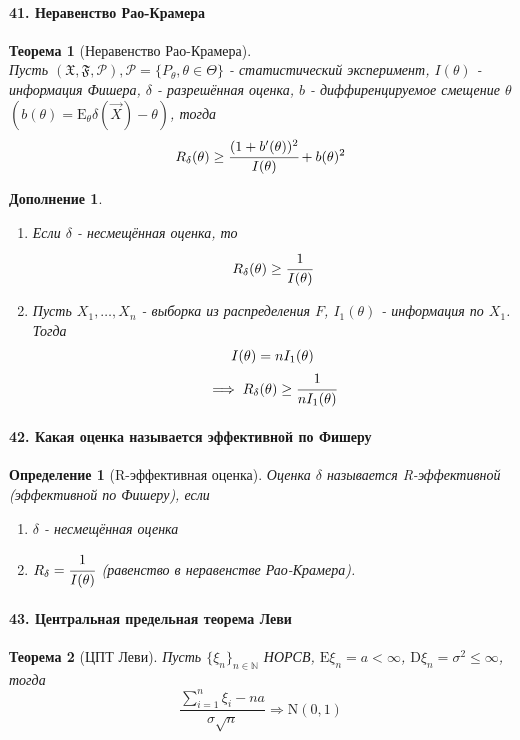 \documentclass[titlepage]{article}
\newcommand{\sP}{\mathcal{P}}
\newcommand{\sF}{\mathfrak{F}}
\newcommand{\sX}{\mathfrak{X}}
\newcommand{\sE}{\mathrm{E}}
\newcommand{\sD}{\mathrm{D}}
\newcommand{\sN}{\mathrm{N}} %
\newtheorem{theorem}{Теорема}
\newtheorem{definition}{Определение}
\newtheorem*{addition}{Дополнение}
\begin{document}
\paragraph{41. Неравенство Рао-Крамера}
\begin{theorem}[Неравенство Рао-Крамера] ~\\
	Пусть $(\sX,\sF,\sP), \sP = \{P_\theta, \theta \in \Theta\}$ - статистический эксперимент, $I(\theta)$ - информация Фишера, $\delta$ - разрешённая оценка, $b$ - диффиренцируемое смещение $\theta$	$(b(\theta) = \sE_\theta\delta(\vec X)-\theta)$, тогда
	\[R_\delta(\theta)\geq\cfrac{(1+b'(\theta))^2}{I(\theta)}+b(\theta)^2\]
\end{theorem}
\begin{addition} ~\\
	\begin{enumerate}
		\item Если $\delta$ - несмещённая оценка, то
		\[R_\delta(\theta)\geq\cfrac{1}{I(\theta)}\]
		\item Пусть $X_1,\dots,X_n$ - выборка из распределения $F$, $I_1(\theta)$ - информация по $X_1$. Тогда
		\begin{gather*}
			I(\theta) = nI_1(\theta)\\
			\implies R_\delta(\theta)\geq\cfrac{1}{nI_1(\theta)}
		\end{gather*}
	\end{enumerate}
\end{addition}

\paragraph{42. Какая оценка называется эффективной по Фишеру}
\begin{definition}[R-эффективная оценка]
	Оценка $\delta$ называется R-эффективной (эффективной по Фишеру), если
	\begin{enumerate}
		\item $\delta$ - несмещённая оценка
		\item $R_\delta = \cfrac{1}{I(\theta)}$ (равенство в неравенстве Рао-Крамера).
	\end{enumerate}
\end{definition}

\paragraph{43. Центральная предельная теорема Леви}
\begin{theorem}[ЦПТ Леви]
	Пусть $\{\xi_n\}_{n\in\mathbb{N}}$ НОРСВ, $\sE\xi_n=a<\infty$, $\sD\xi_n=\sigma^2\leq\infty$, тогда 
	$$\frac{\sum_{i=1}^n\xi_i - na}{\sigma\sqrt{n}}\Rightarrow \sN(0,1)$$
\end{theorem}
\end{document}
